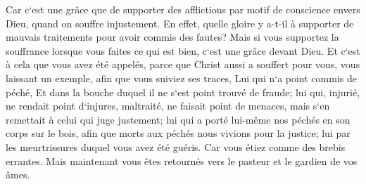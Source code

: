 \verse Car c`est une grâce que de supporter des afflictions par motif de conscience envers Dieu, quand on souffre injustement. 
\verse En effet, quelle gloire y a-t-il à supporter de mauvais traitements pour avoir commis des fautes? Mais si vous supportez la souffrance lorsque vous faites ce qui est bien, c`est une grâce devant Dieu. 
\verse Et c`est à cela que vous avez été appelés, parce que Christ aussi a souffert pour vous, vous laissant un exemple, afin que vous suiviez ses traces, 
\verse Lui qui n`a point commis de péché, Et dans la bouche duquel il ne s`est point trouvé de fraude; 
\verse lui qui, injurié, ne rendait point d`injures, maltraité, ne faisait point de menaces, mais s`en remettait à celui qui juge justement; 
\verse lui qui a porté lui-même nos péchés en son corps sur le bois, afin que morts aux péchés nous vivions pour la justice; lui par les meurtrissures duquel vous avez été guéris. 
\verse Car vous étiez comme des brebis errantes. Mais maintenant vous êtes retournés vers le pasteur et le gardien de vos âmes. 

